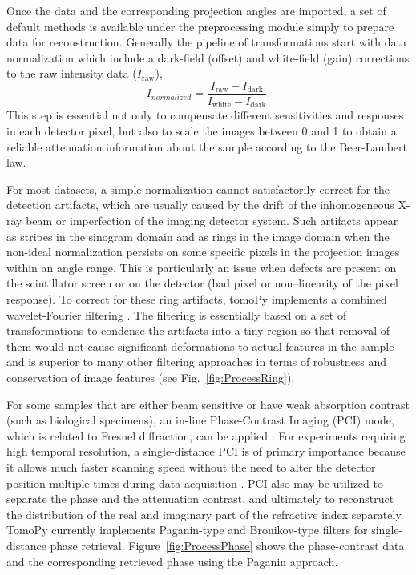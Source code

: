 \documentclass[pdf]{iucr}              %
\begin{document}
Once the data and the corresponding projection angles are imported, a set of default methods is available under the preprocessing module simply to prepare data for reconstruction. Generally the pipeline of transformations start with data normalization which include a dark-field (offset) and white-field (gain) corrections to the raw intensity data ($I_{\mbox{raw}}$),
\begin{equation}
I_{normalized}=\frac{I_{\mbox{raw}}-I_{\mbox{dark}}}{I_{\mbox{white}}-I_{\mbox{dark}}}.
\end{equation}
This step is essential not only to compensate different sensitivities and responses in each detector pixel, but also to scale the images between 0 and 1 to obtain a reliable attenuation information about the sample according to the Beer-Lambert law. 

For most datasets, a simple normalization cannot satisfactorily correct for the detection artifacts, which are usually caused by the drift of the inhomogeneous X-ray beam or imperfection of the imaging detector system. Such artifacts appear as stripes in the sinogram domain and as rings in the image domain when the non-ideal normalization persists on some specific pixels in the projection images within an angle range. This is particularly an issue when defects are present on the scintillator screen or on the detector (bad pixel or non--linearity of the pixel response). To correct for these ring artifacts, tomoPy implements a combined wavelet-Fourier filtering  \cite{Munch:09}. The filtering is essentially based on a set of transformations to condense the artifacts into a tiny region so that removal of them would not cause significant deformations to actual features in the sample and is superior to many other filtering approaches in terms of robustness and conservation of image features (see Fig.~\ref{fig:ProcessRing}).

For some samples that are either beam sensitive or have weak absorption contrast (such as biological specimens), an in-line Phase-Contrast Imaging (PCI) mode, which is related to Fresnel diffraction, can be applied \cite{Davis1999}. For  experiments requiring high temporal resolution, a single-distance PCI is of primary importance because it allows much faster scanning speed without the need to alter the detector position multiple times during data acquisition \cite{Burvall:11}. PCI also may be utilized to separate the phase and the attenuation contrast, and ultimately to reconstruct the distribution of the real and imaginary part of the refractive index separately. TomoPy currently implements Paganin-type \cite{Paganin_2002} and Bronikov-type \cite{Bronnikov1999} filters for single-distance phase retrieval. Figure~\ref{fig:ProcessPhase} shows the phase-contrast data and the corresponding retrieved phase using the Paganin approach.
\end{document}
